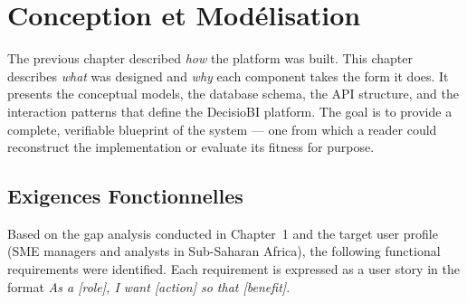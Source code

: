 
\chapter{Conception et Modélisation}


\noindent
The previous chapter described \emph{how} the platform was built.
This chapter describes \emph{what} was designed and \emph{why}
each component takes the form it does.
It presents the conceptual models, the database schema,
the API structure, and the interaction patterns
that define the DecisioBI platform.
The goal is to provide a complete, verifiable blueprint
of the system — one from which a reader could reconstruct
the implementation or evaluate its fitness for purpose.


\section{Exigences Fonctionnelles}

\noindent
Based on the gap analysis conducted in Chapter~1
and the target user profile (SME managers and analysts
in Sub-Saharan Africa), the following functional
requirements were identified.
Each requirement is expressed as a user story
in the format \textit{As a [role], I want [action]
so that [benefit].}


